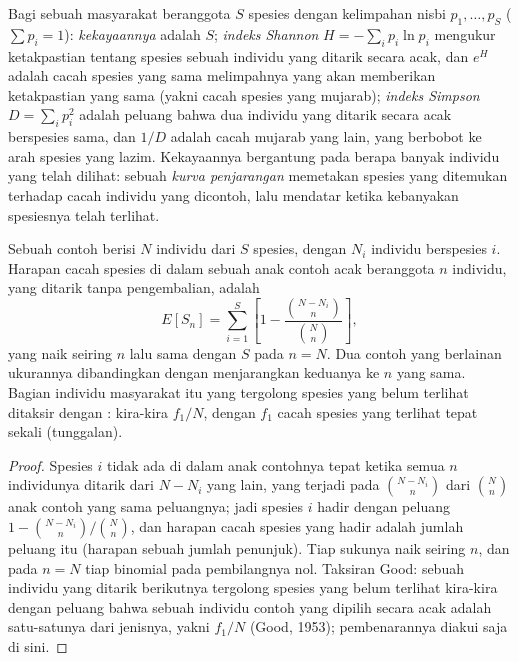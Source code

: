 \begin{definition}[Keanekaan]\label{def:b3:microbiomes:diversity}
%
Bagi sebuah masyarakat beranggota $S$ spesies dengan kelimpahan nisbi $p_{1},\dots,
p_{S}$ ($\sum p_{i} = 1$): \emph{kekayaannya} adalah $S$; \emph{indeks
Shannon} $H = -\sum_{i} p_{i}\ln p_{i}$ mengukur ketakpastian tentang spesies
sebuah individu yang ditarik secara acak, dan $e^{H}$ adalah cacah spesies
yang sama melimpahnya yang akan memberikan ketakpastian yang sama (yakni cacah
spesies yang mujarab); \emph{indeks Simpson} $D = \sum_{i} p_{i}^{2}$ adalah
peluang bahwa dua individu yang ditarik secara acak berspesies sama, dan $1/D$
adalah cacah mujarab yang lain, yang berbobot ke arah spesies yang lazim.
Kekayaannya bergantung pada berapa banyak individu yang telah dilihat: sebuah
\emph{kurva penjarangan} memetakan spesies yang ditemukan terhadap cacah
individu yang dicontoh, lalu mendatar ketika kebanyakan spesiesnya telah
terlihat.
\end{definition}

\begin{theorem}[Penjarangan]\label{thm:b3:microbiomes:rarefaction}
Sebuah contoh berisi $N$ individu dari $S$ spesies, dengan $N_{i}$ individu
berspesies $i$. Harapan cacah spesies di dalam sebuah anak contoh acak
beranggota $n$ individu, yang ditarik tanpa pengembalian, adalah
\[
E[S_{n}] = \sum_{i=1}^{S}\left[1 - \frac{\binom{N - N_{i}}{n}}
{\binom{N}{n}}\right],
\]
yang naik seiring $n$ lalu sama dengan $S$ pada $n = N$. Dua contoh yang
berlainan ukurannya dibandingkan dengan menjarangkan keduanya ke $n$ yang sama.
Bagian individu masyarakat itu yang tergolong spesies yang belum terlihat
ditaksir dengan \emph{}: kira-kira $f_{1}/N$, dengan
$f_{1}$ cacah spesies yang terlihat tepat sekali (tunggalan).
\end{theorem}
\begin{proof}
Spesies $i$ tidak ada di dalam anak contohnya tepat ketika semua $n$
individunya ditarik dari $N - N_{i}$ yang lain, yang terjadi pada
$\binom{N - N_{i}}{n}$ dari $\binom{N}{n}$ anak contoh yang sama peluangnya;
jadi spesies $i$ hadir dengan peluang $1 - \binom{N-N_{i}}{n}/
\binom{N}{n}$, dan harapan cacah spesies yang hadir adalah jumlah
peluang itu (harapan sebuah jumlah penunjuk). Tiap sukunya
naik seiring $n$, dan pada $n = N$ tiap binomial pada pembilangnya
nol. Taksiran Good: sebuah individu yang ditarik berikutnya tergolong spesies
yang belum terlihat kira-kira dengan peluang bahwa sebuah individu contoh yang
dipilih secara acak adalah satu-satunya dari jenisnya, yakni $f_{1}/N$ (Good,
1953); pembenarannya diakui saja di sini.
\end{proof}

